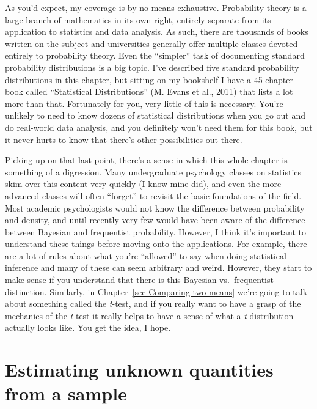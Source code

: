 \documentclass[
  a4paper,
]{book}
\begin{document}
As you'd expect, my coverage is by no means exhaustive. Probability
theory is a large branch of mathematics in its own right, entirely
separate from its application to statistics and data analysis. As such,
there are thousands of books written on the subject and universities
generally offer multiple classes devoted entirely to probability theory.
Even the ``simpler'' task of documenting standard probability
distributions is a big topic. I've described five standard probability
distributions in this chapter, but sitting on my bookshelf I have a
45-chapter book called ``Statistical Distributions'' (M. Evans et al.,
2011) that lists a lot more than that. Fortunately for you, very little
of this is necessary. You're unlikely to need to know dozens of
statistical distributions when you go out and do real-world data
analysis, and you definitely won't need them for this book, but it never
hurts to know that there's other possibilities out there.

Picking up on that last point, there's a sense in which this whole
chapter is something of a digression. Many undergraduate psychology
classes on statistics skim over this content very quickly (I know mine
did), and even the more advanced classes will often ``forget'' to
revisit the basic foundations of the field. Most academic psychologists
would not know the difference between probability and density, and until
recently very few would have been aware of the difference between
Bayesian and frequentist probability. However, I think it's important to
understand these things before moving onto the applications. For
example, there are a lot of rules about what you're ``allowed'' to say
when doing statistical inference and many of these can seem arbitrary
and weird. However, they start to make sense if you understand that
there is this Bayesian vs.~frequentist distinction. Similarly, in
Chapter~\ref{sec-Comparing-two-means} we're going to talk about
something called the \emph{t}-test, and if you really want to have a
grasp of the mechanics of the \emph{t}-test it really helps to have a
sense of what a \emph{t}-distribution actually looks like. You get the
idea, I hope.

\hypertarget{sec-Estimating-unknown-quantities-from-a-sample}{%
\chapter{Estimating unknown quantities from a
sample}\label{sec-Estimating-unknown-quantities-from-a-sample}}
\end{document}
